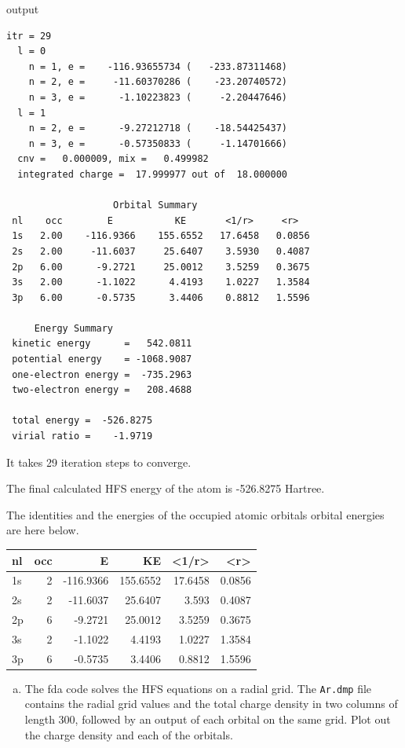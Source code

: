 \documentclass[11pt]{article}
\begin{document}
output
\begin{verbatim}
itr = 29
  l = 0
    n = 1, e =    -116.93655734 (   -233.87311468)
    n = 2, e =     -11.60370286 (    -23.20740572)
    n = 3, e =      -1.10223823 (     -2.20447646)
  l = 1
    n = 2, e =      -9.27212718 (    -18.54425437)
    n = 3, e =      -0.57350833 (     -1.14701666)
  cnv =   0.000009, mix =   0.499982
  integrated charge =  17.999977 out of  18.000000

                   Orbital Summary
 nl    occ        E           KE       <1/r>     <r>
 1s   2.00    -116.9366    155.6552   17.6458   0.0856
 2s   2.00     -11.6037     25.6407    3.5930   0.4087
 2p   6.00      -9.2721     25.0012    3.5259   0.3675
 3s   2.00      -1.1022      4.4193    1.0227   1.3584
 3p   6.00      -0.5735      3.4406    0.8812   1.5596

     Energy Summary
 kinetic energy      =   542.0811
 potential energy    = -1068.9087
 one-electron energy =  -735.2963
 two-electron energy =   208.4688

 total energy =  -526.8275
 virial ratio =    -1.9719
\end{verbatim}

It takes 29 iteration steps to converge.

The final calculated HFS energy of the atom is -526.8275 Hartree.

The identities and the energies of the occupied atomic orbitals orbital energies are here below.

\begin{center}
\begin{tabular}{lrrrrr}
nl & occ & E & KE & <1/r> & <r>\\
\hline
1s & 2 & -116.9366 & 155.6552 & 17.6458 & 0.0856\\
2s & 2 & -11.6037 & 25.6407 & 3.593 & 0.4087\\
2p & 6 & -9.2721 & 25.0012 & 3.5259 & 0.3675\\
3s & 2 & -1.1022 & 4.4193 & 1.0227 & 1.3584\\
3p & 6 & -0.5735 & 3.4406 & 0.8812 & 1.5596\\
\end{tabular}
\end{center}

\begin{enumerate}[(b)]
\item The fda code solves the HFS equations on a radial grid. The \texttt{Ar.dmp} file contains the radial grid values and the total charge density in two columns of length 300, followed by an output of each orbital on the same grid. Plot out the charge density and each of the orbitals.
\end{enumerate}
\end{document}
